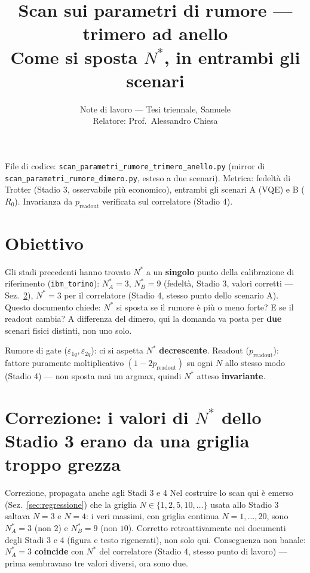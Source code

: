\documentclass[11pt,a4paper]{article}
\title{\vspace{-1.5em}\color{inkblue}Scan sui parametri di rumore --- trimero ad anello\\[0.2em]
\Large\normalfont\color{softgray}Come si sposta $N^*$, in entrambi gli scenari}
\author{Note di lavoro --- Tesi triennale, Samuele\\ Relatore: Prof.\ Alessandro Chiesa}
\date{}
\begin{document}
\sloppy
\maketitle
\thispagestyle{fancy}
\vspace{-2.0em}

File di codice: \texttt{scan\_\allowbreak parametri\_rumore\_trimero\_anello.py}
(mirror di \texttt{scan\_parametri\_rumore\_dimero.py}, esteso a due
scenari). Metrica: fedeltà di Trotter (Stadio 3, osservabile più
economico), entrambi gli scenari A (VQE) e B ($R_0$). Invarianza da
$p_\text{readout}$ verificata sul correlatore (Stadio 4).

\tableofcontents

\section{Obiettivo}

Gli stadi precedenti hanno trovato $N^*$ a un \textbf{singolo} punto
della calibrazione di riferimento (\texttt{ibm\_torino}): $N^*_A=3$,
$N^*_B=9$ (fedeltà, Stadio 3, valori corretti --- Sez.~\ref{sec:correzione}),
$N^*=3$ per il correlatore (Stadio 4, stesso punto dello scenario A).
Questo documento chiede: $N^*$ si sposta se il rumore è più o meno
forte? E se il readout cambia? A differenza del dimero, qui la domanda
va posta per \textbf{due} scenari fisici distinti, non uno solo.

\begin{keyeq}[title={Previsione, prima della verifica --- stessa del dimero}]
Rumore di gate ($\varepsilon_{1q},\varepsilon_{2q}$): ci si aspetta
$N^*$ \textbf{decrescente}. Readout ($p_\text{readout}$): fattore
puramente moltiplicativo $(1-2p_\text{readout})$ su ogni $N$ allo stesso
modo (Stadio 4) --- non sposta mai un argmax, quindi $N^*$ atteso
\textbf{invariante}.
\end{keyeq}

\section{Correzione: i valori di \texorpdfstring{$N^*$}{N*} dello Stadio 3 erano da una griglia troppo grezza}
\label{sec:correzione}

\begin{okbox}{Correzione, propagata anche agli Stadi 3 e 4}
Nel costruire lo scan qui è emerso (Sez.~\ref{sec:regressione}) che la
griglia $N\in\{1,2,5,10,\ldots\}$ usata allo Stadio 3 saltava $N=3$ e
$N=4$: i veri massimi, con griglia continua $N=1,\ldots,20$, sono
$N^*_A=3$ (non $2$) e $N^*_B=9$ (non $10$). Corretto retroattivamente
nei documenti degli Stadi 3 e 4 (figura e testo rigenerati), non solo
qui. Conseguenza non banale: $N^*_A=3$ \textbf{coincide} con $N^*$ del
correlatore (Stadio 4, stesso punto di lavoro) --- prima sembravano
tre valori diversi, ora sono due.
\end{okbox}
\end{document}
